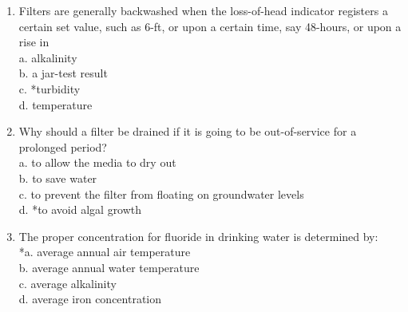 \begin{enumerate}
  \item Filters are generally backwashed when the loss-of-head indicator registers a certain set value, such as 6-ft, or upon a certain time, say 48-hours, or upon a rise in\\
a. alkalinity\\
b. a jar-test result\\
c. *turbidity\\
d. temperature\\

  \item Why should a filter be drained if it is going to be out-of-service for a prolonged period?\\
a. to allow the media to dry out\\
b. to save water\\
c. to prevent the filter from floating on groundwater levels\\
d. *to avoid algal growth\\

\item The proper concentration for fluoride in drinking water is determined by:\\
*a. average annual air temperature\\ 
b.  average annual water  temperature\\
c.  average alkalinity\\
d.	average iron concentration\\


\end{enumerate}
